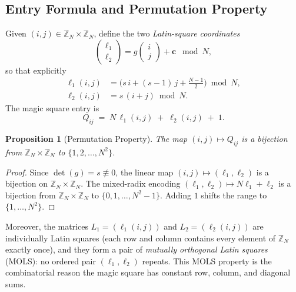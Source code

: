 \documentclass[aip,jmp,reprint,superscriptaddress,floatfix,nofootinbib]{revtex4-2}
\newtheorem{proposition}[theorem]{Proposition}
\theoremstyle{definition}
\theoremstyle{remark}
\newcommand{\ZN}{\mathbb{Z}_N}
\begin{document}
\subsection{Entry Formula and Permutation Property}
\label{sec:gl2:entry}

Given $(i,j) \in \ZN \times \ZN$, define the two \emph{Latin-square
coordinates}
\begin{equation}\label{eq:latin}
\begin{pmatrix} \ell_1 \\ \ell_2 \end{pmatrix}
= g \begin{pmatrix} i \\ j \end{pmatrix} + \mathbf{c}
\;\bmod N,
\end{equation}
so that explicitly
\begin{align}
\ell_1(i,j) &= \bigl(s\,i + (s{-}1)\,j + \tfrac{N-1}{2}\bigr) \bmod N,
  \label{eq:l1}\\
\ell_2(i,j) &= s\,(i+j) \bmod N.
  \label{eq:l2}
\end{align}
The magic square entry is
\begin{equation}\label{eq:entry}
Q_{ij} \;=\; N\,\ell_1(i,j) \;+\; \ell_2(i,j) \;+\; 1.
\end{equation}

\begin{proposition}[Permutation Property]\label{prop:permutation}
The map $(i,j) \mapsto Q_{ij}$ is a bijection from $\ZN \times \ZN$
to $\{1, 2, \ldots, N^2\}$.
\end{proposition}

\begin{proof}
Since $\det(g) = s \not\equiv 0$, the linear map
$(i,j) \mapsto (\ell_1, \ell_2)$ is a bijection on
$\ZN \times \ZN$.  The mixed-radix encoding
$(\ell_1, \ell_2) \mapsto N\ell_1 + \ell_2$ is a bijection from
$\ZN \times \ZN$ to $\{0, 1, \ldots, N^2 - 1\}$.  Adding $1$
shifts the range to $\{1, \ldots, N^2\}$.
\end{proof}

Moreover, the matrices $L_1 = (\ell_1(i,j))$ and
$L_2 = (\ell_2(i,j))$ are individually Latin squares (each row and
column contains every element of $\ZN$ exactly once), and they form a
pair of \emph{mutually orthogonal Latin squares} (MOLS): no ordered
pair $(\ell_1, \ell_2)$ repeats.  This MOLS property is the
combinatorial reason the magic square has constant row, column, and
diagonal sums.
\end{document}
